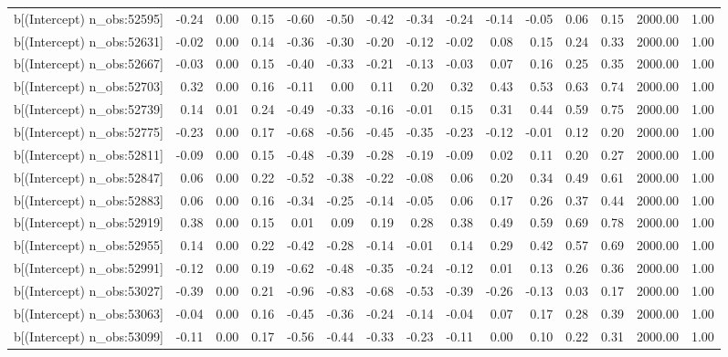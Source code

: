 \begin{table}[ht]
\begin{tabular}{rrrrrrrrrrrrrrr}
  b[(Intercept) n\_obs:52595] & -0.24 & 0.00 & 0.15 & -0.60 & -0.50 & -0.42 & -0.34 & -0.24 & -0.14 & -0.05 & 0.06 & 0.15 & 2000.00 & 1.00 \\ 
  b[(Intercept) n\_obs:52631] & -0.02 & 0.00 & 0.14 & -0.36 & -0.30 & -0.20 & -0.12 & -0.02 & 0.08 & 0.15 & 0.24 & 0.33 & 2000.00 & 1.00 \\ 
  b[(Intercept) n\_obs:52667] & -0.03 & 0.00 & 0.15 & -0.40 & -0.33 & -0.21 & -0.13 & -0.03 & 0.07 & 0.16 & 0.25 & 0.35 & 2000.00 & 1.00 \\ 
  b[(Intercept) n\_obs:52703] & 0.32 & 0.00 & 0.16 & -0.11 & 0.00 & 0.11 & 0.20 & 0.32 & 0.43 & 0.53 & 0.63 & 0.74 & 2000.00 & 1.00 \\ 
  b[(Intercept) n\_obs:52739] & 0.14 & 0.01 & 0.24 & -0.49 & -0.33 & -0.16 & -0.01 & 0.15 & 0.31 & 0.44 & 0.59 & 0.75 & 2000.00 & 1.00 \\ 
  b[(Intercept) n\_obs:52775] & -0.23 & 0.00 & 0.17 & -0.68 & -0.56 & -0.45 & -0.35 & -0.23 & -0.12 & -0.01 & 0.12 & 0.20 & 2000.00 & 1.00 \\ 
  b[(Intercept) n\_obs:52811] & -0.09 & 0.00 & 0.15 & -0.48 & -0.39 & -0.28 & -0.19 & -0.09 & 0.02 & 0.11 & 0.20 & 0.27 & 2000.00 & 1.00 \\ 
  b[(Intercept) n\_obs:52847] & 0.06 & 0.00 & 0.22 & -0.52 & -0.38 & -0.22 & -0.08 & 0.06 & 0.20 & 0.34 & 0.49 & 0.61 & 2000.00 & 1.00 \\ 
  b[(Intercept) n\_obs:52883] & 0.06 & 0.00 & 0.16 & -0.34 & -0.25 & -0.14 & -0.05 & 0.06 & 0.17 & 0.26 & 0.37 & 0.44 & 2000.00 & 1.00 \\ 
  b[(Intercept) n\_obs:52919] & 0.38 & 0.00 & 0.15 & 0.01 & 0.09 & 0.19 & 0.28 & 0.38 & 0.49 & 0.59 & 0.69 & 0.78 & 2000.00 & 1.00 \\ 
  b[(Intercept) n\_obs:52955] & 0.14 & 0.00 & 0.22 & -0.42 & -0.28 & -0.14 & -0.01 & 0.14 & 0.29 & 0.42 & 0.57 & 0.69 & 2000.00 & 1.00 \\ 
  b[(Intercept) n\_obs:52991] & -0.12 & 0.00 & 0.19 & -0.62 & -0.48 & -0.35 & -0.24 & -0.12 & 0.01 & 0.13 & 0.26 & 0.36 & 2000.00 & 1.00 \\ 
  b[(Intercept) n\_obs:53027] & -0.39 & 0.00 & 0.21 & -0.96 & -0.83 & -0.68 & -0.53 & -0.39 & -0.26 & -0.13 & 0.03 & 0.17 & 2000.00 & 1.00 \\ 
  b[(Intercept) n\_obs:53063] & -0.04 & 0.00 & 0.16 & -0.45 & -0.36 & -0.24 & -0.14 & -0.04 & 0.07 & 0.17 & 0.28 & 0.39 & 2000.00 & 1.00 \\ 
  b[(Intercept) n\_obs:53099] & -0.11 & 0.00 & 0.17 & -0.56 & -0.44 & -0.33 & -0.23 & -0.11 & 0.00 & 0.10 & 0.22 & 0.31 & 2000.00 & 1.00 \\ 

\end{tabular}
\end{table}

